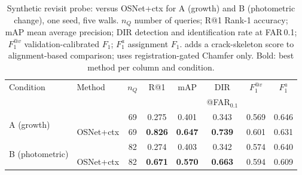 \begin{table}[t]

\centering

\scriptsize\setlength{\tabcolsep}{2pt}

 \caption{Synthetic revisit probe: \hybrid{} versus OSNet+ctx for A (growth) and B (photometric change), one seed, five walls. $n_{Q}$ number of queries; R@1 Rank-1 accuracy; mAP mean average precision; DIR detection and identification rate at FAR\,0.1; $F_{1}^{@v}$ validation-calibrated $F_1$; $F_{1}^{a}$ assignment $F_1$. \hybrid{} adds a crack-skeleton score to alignment-based comparison; \ours{} uses registration-gated Chamfer only. Bold: best method per column and condition.}

\label{tab:hybrid}

\begin{tabular}{llcccccc}

\toprule

Condition & Method & $n_{Q}$ & R@1 & mAP & DIR & $F_{1}^{@v}$ & $F_{1}^{a}$ \\

& & & & & {\scriptsize @FAR$_{0.1}$} & & \\

\midrule

\multirow{2}{*}{A (growth)} & \hybrid{} & 69 & 0.275 & 0.401 & 0.343 & 0.569 & 0.646 \\

 & OSNet+ctx & 69 & \textbf{0.826} & \textbf{0.647} & \textbf{0.739} & 0.601 & 0.631 \\

\midrule

\multirow{2}{*}{B (photometric)} & \hybrid{} & 82 & 0.274 & 0.403 & 0.342 & 0.574 & 0.640 \\

 & OSNet+ctx & 82 & \textbf{0.671} & \textbf{0.570} & \textbf{0.663} & 0.594 & 0.609 \\

\bottomrule

\end{tabular}

\end{table}